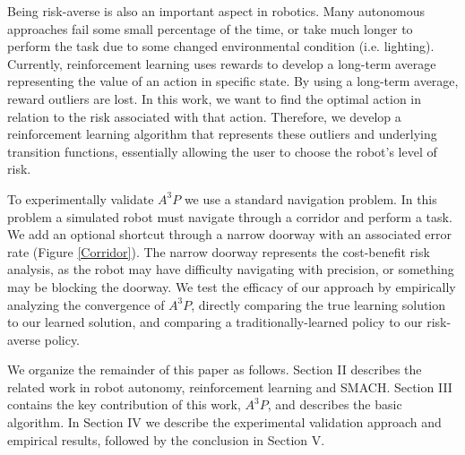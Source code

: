 \documentclass[letterpaper, 10 pt, conference]{ieeeconf}  %
\begin{document}

Being risk-averse is also an important aspect in robotics. Many autonomous approaches fail some small percentage of the time, or take much longer to perform the task due to some changed environmental condition (i.e. lighting). Currently, reinforcement learning uses rewards to develop a long-term average representing the value of an action in specific state. By using a long-term average, reward outliers are lost. In this work, we want to find the optimal action in relation to the risk associated with that action. Therefore, we develop a reinforcement learning algorithm that represents these outliers and underlying transition functions, essentially allowing the user to choose the robot's level of risk. 



To experimentally validate $A^3P$ we use a standard navigation problem. In this problem a simulated robot must navigate through a corridor and perform a task. We add an optional shortcut through a narrow doorway with an associated error rate (Figure \ref{Corridor}). The narrow doorway represents the cost-benefit risk analysis, as the robot may have difficulty navigating with precision, or something may be blocking the doorway. We test the efficacy of our approach by empirically analyzing the convergence of $A^3P$, directly comparing the true learning solution to our learned solution, and comparing a traditionally-learned policy to our risk-averse policy.

We organize the remainder of this paper as follows. Section II describes the related work in robot autonomy, reinforcement learning and SMACH. Section III contains the key contribution of this work, $A^3P$, and describes the basic algorithm. In Section IV we describe the experimental validation approach and empirical results, followed by the conclusion in Section V.
\end{document}
